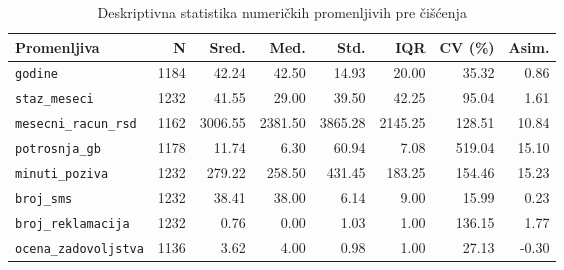 \documentclass[a4paper,12pt]{article}
\begin{document}
    \begin{table}[htbp]
    \centering
    \caption{Deskriptivna statistika numeričkih promenljivih pre čišćenja}
    \label{tab:mere-pre}
    \small
    \begin{tabular}{lrrrrrrr}
    \toprule
    \textbf{Promenljiva} &
    \textbf{N} &
    \textbf{Sred.} &
    \textbf{Med.} &
    \textbf{Std.} &
    \textbf{IQR} &
    \textbf{CV (\%)} &
    \textbf{Asim.} \\
    \midrule

    \texttt{godine}
    & 1184 & 42.24 & 42.50 & 14.93 & 20.00 & 35.32 & 0.86 \\

    \texttt{staz\_meseci}
    & 1232 & 41.55 & 29.00 & 39.50 & 42.25 & 95.04 & 1.61 \\

    \texttt{mesecni\_racun\_rsd}
    & 1162 & 3006.55 & 2381.50 & 3865.28 & 2145.25 & 128.51 & 10.84 \\

    \texttt{potrosnja\_gb}
    & 1178 & 11.74 & 6.30 & 60.94 & 7.08 & 519.04 & 15.10 \\

    \texttt{minuti\_poziva}
    & 1232 & 279.22 & 258.50 & 431.45 & 183.25 & 154.46 & 15.23 \\

    \texttt{broj\_sms}
    & 1232 & 38.41 & 38.00 & 6.14 & 9.00 & 15.99 & 0.23 \\

    \texttt{broj\_reklamacija}
    & 1232 & 0.76 & 0.00 & 1.03 & 1.00 & 136.15 & 1.77 \\

    \texttt{ocena\_zadovoljstva}
    & 1136 & 3.62 & 4.00 & 0.98 & 1.00 & 27.13 & -0.30 \\

    \bottomrule
    \end{tabular}
    \end{table}
\end{document}
